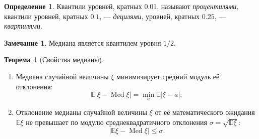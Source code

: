 \documentclass[oneside,final,14pt]{extreport}
\theoremstyle{plain}
\theoremstyle{definition}
\newtheorem*{defn}{Определение}
\newtheorem*{rmrk}{Замечание}
\theoremstyle{named}
\newtheorem*{namedthm}{Теорема}
\begin{document}
\begin{defn}
    Квантили уровней, кратных $0.01$, называют {\it процентилями}, квантили уровней, кратных $0.1$, — {\it децилями}, уровней, кратных $0.25$, — {\it квартилями}.
\end{defn} 

\begin{rmrk}
    Медиана является квантилем уровня $1 / 2$.
\end{rmrk} 

\begin{namedthm}[Свойства медианы]\leavevmode
\begin{enumerate}
    \item Медиана случайной величины $\xi$ минимизирует средний модуль её отклонения:
    \begin{equation*}
        \mathbb{E}|\xi - \operatorname{Med} \xi| 
    = \min _{a} \mathbb{E}|\xi-a|;
    \end{equation*}
    \item Отклонение медианы случайной величины $\xi$ от её математического ожидания $\mathbb{E}\xi$ не превышает по модулю среднеквадратичного отклонения $\sigma = \sqrt{\mathbb{D}\xi}$:
    \begin{equation*}
        |\mathbb{E}\xi - \operatorname{Med}\xi| \leqslant \sigma.
    \end{equation*}
\end{enumerate}
\end{namedthm}
\end{document}
